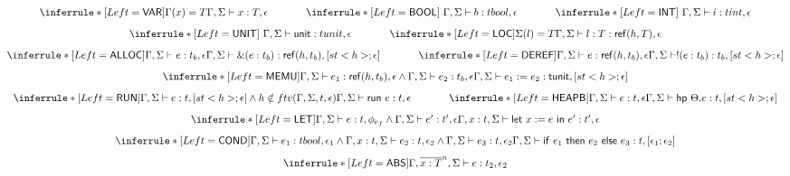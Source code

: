\begin{figure}[H]
 \small
  \[
\begin{array}{@{}c@{}}
   \inferrule*[Left=\kw{VAR}]{\Gamma(x) = T}{\typerule \Gamma \Sigma x T \epsilon}\ \ \ \ \ \ \ \ \ \ \ 
    \inferrule*[Left=\kw{BOOL}]{~}{\typerule \Gamma \Sigma {b} {tbool} \epsilon}\ \ \ \ \ \ \ \ \ \ \ 
    \inferrule*[Left=\kw{INT}]{~}{\typerule \Gamma \Sigma {i} {tint} \epsilon}\\[2ex]
    \inferrule*[Left=\kw{UNIT}]{~}{\typerule \Gamma \Sigma \kunit {tunit} \epsilon}\ \ \ \ \ \ \ \ \ \ \ 
     \inferrule*[Left=\kw{LOC}]{\Sigma(l) = T}{\typerule \Gamma \Sigma {\addr {l} {T}}  {\reft h T} \epsilon}\\[2ex]
      \inferrule*[Left=\kw{ALLOC}]{\typerule \Gamma \Sigma e {t_b} \epsilon}{\typerule \Gamma \Sigma {\alloc {e} {t_b}}  {\reft h {t_b}} [\hid{h}; \epsilon]}\ \ \ \ \ \ \ \ \ \ \
            \inferrule*[Left=\kw{DEREF}]{\typerule \Gamma \Sigma e {\reft h {t_b}} \epsilon}{\typerule \Gamma \Sigma {\deref {e} {t_b}}  {t_b} [\hid{h}; \epsilon]}\\[2ex]
             \inferrule*[Left=\kw{MEMU}]{\typerule \Gamma \Sigma {e_1} {\reft h {t_b}} \epsilon \wedge \typerule \Gamma \Sigma {e_2} {t_b} \epsilon}{\typerule \Gamma \Sigma {\eass {e_1} {e_2}}  {\kw{tunit}} [\hid{h}; \epsilon]}\\[2ex]
                          \inferrule*[Left=\kw{RUN}]{\typerule \Gamma \Sigma {e} {t} {[\hid{h}; \epsilon]} \wedge h \notin ftv(\Gamma, \Sigma, t, \epsilon)}{\typerule \Gamma \Sigma {\run {e}}  {t} \epsilon}\ \ \ \ \ \ \ \ \ \ \ 
                           \inferrule*[Left=\kw{HEAPB}]{\typerule \Gamma \Sigma {e} {t} {\epsilon}}{\typerule \Gamma \Sigma {\hpe \kheap e}  {t} [\hid{h}; \epsilon]}\\[2ex] 
                            \inferrule*[Left=\kw{LET}]{\typerule \Gamma \Sigma {e} {t} {\phi_{e_f}} \wedge \typerule \Gamma \Sigma {e'} {t'} {\epsilon}}{\typerule {\Gamma, x : t} \Sigma {\elet x {e} {e'}}  {t'} \epsilon}\\[2ex]
                             \inferrule*[Left=\kw{COND}]{\typerule \Gamma \Sigma {e_1} {tbool} {\epsilon_1} \wedge \typerule {\Gamma, x : t} \Sigma {e_2} {t} {\epsilon_2} \wedge \typerule \Gamma \Sigma {e_3} {t} {\epsilon_2} }{\typerule \Gamma \Sigma {\cond {e_1} {e_2} {e_3}}  {t} [\epsilon_1; \epsilon_2]}\\[2ex]
                              \inferrule*[Left=\kw{ABS}]{\typerule {\Gamma, \overline{x : T}^n} \Sigma {e} {t_2} {\epsilon_2}}

\end{array}\]
\end{figure}
